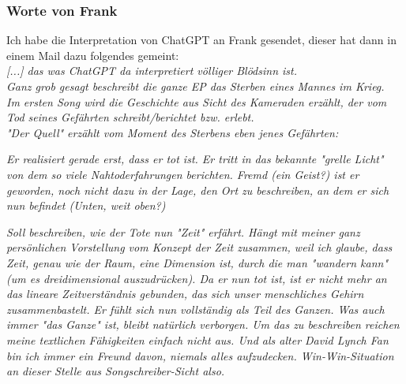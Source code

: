 \documentclass[twocolumn,10pt]{article}
\begin{document}
			\subsubsection{Worte von Frank}
			Ich habe die Interpretation von ChatGPT an Frank gesendet, dieser hat dann in einem Mail\cite{Mail} dazu folgendes gemeint:\\
			\textit{[...] das was ChatGPT da interpretiert völliger Blödsinn ist.}\\
			\textit{Ganz grob gesagt beschreibt die ganze EP  das Sterben eines Mannes im Krieg.}\\
			\textit{Im ersten Song  wird die Geschichte aus Sicht des Kameraden erzählt, der vom Tod seines Gefährten schreibt/berichtet bzw. erlebt.}\\
			\textit{"Der Quell" erzählt vom Moment des Sterbens eben jenes Gefährten:}
			\begin{center}
			\end{center}
			\textit{Er realisiert gerade erst, dass er tot ist. Er tritt in das bekannte "grelle Licht" von dem so viele Nahtoderfahrungen berichten. Fremd (ein Geist?) ist er geworden, noch nicht dazu in der Lage, den Ort zu beschreiben, an dem er sich nun befindet (Unten, weit oben?)}
			\begin{center}
			\end{center}
			\textit{Soll beschreiben, wie der Tote nun "Zeit" erfährt. Hängt mit meiner ganz persönlichen Vorstellung vom Konzept der Zeit zusammen, weil ich glaube, dass Zeit, genau wie der Raum, eine Dimension ist, durch die man "wandern kann" (um es dreidimensional auszudrücken). Da er nun tot ist, ist er nicht mehr an das lineare Zeitverständnis gebunden, das sich unser menschliches Gehirn zusammenbastelt. Er fühlt sich nun vollständig als Teil des Ganzen. Was auch immer "das Ganze" ist, bleibt natürlich verborgen. Um das zu beschreiben reichen meine textlichen Fähigkeiten einfach nicht aus. Und als alter David Lynch Fan bin ich immer ein Freund davon, niemals alles aufzudecken. Win-Win-Situation an dieser Stelle aus Songschreiber-Sicht also.}
\end{document}

